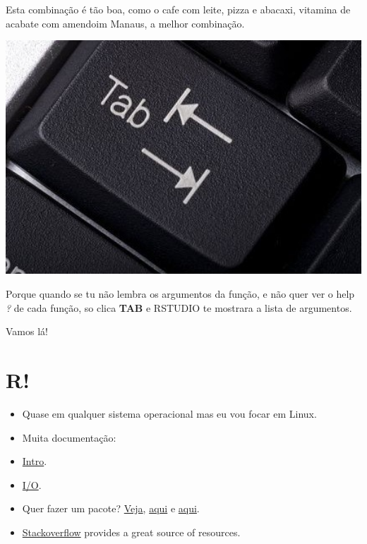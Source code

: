 \documentclass[]{book}
\providecommand{\tightlist}{%
  \setlength{\itemsep}{0pt}\setlength{\parskip}{0pt}}
\begin{document}
Esta combinação é tão boa, como o cafe com leite, pizza e abacaxi,
vitamina de acabate com amendoim Manaus, a melhor combinação.

\includegraphics[width=5.88in]{figuras/tab-key-}

Porque quando se tu não lembra os argumentos da função, e não quer ver o
help \emph{?} de cada função, so clica \textbf{TAB} e RSTUDIO te
mostrara a lista de argumentos.

Vamos lá!

\chapter{R!}\label{r}

\begin{itemize}
\tightlist
\item
  Quase em qualquer sistema operacional mas eu vou focar em Linux.
\item
  Muita documentação:
\item
  \href{http://cran.r-project.org/doc/manuals/r-release/R-intro.html}{Intro}.
\item
  \href{http://cran.r-project.org/doc/manuals/r-release/R-data.html}{I/O}.
\item
  Quer fazer um pacote?
  \href{http://cran.r-project.org/doc/manuals/r-release/R-exts.html}{Veja},
  \href{http://cran.r-project.org/doc/manuals/r-release/R-ints.html}{aqui}
  e
  \href{http://cran.r-project.org/doc/manuals/r-release/R-lang.html}{aqui}.
\item
  \href{https://stackoverflow.com/questions/tagged/r}{Stackoverflow}
  provides a great source of resources.
\end{itemize}
\end{document}
